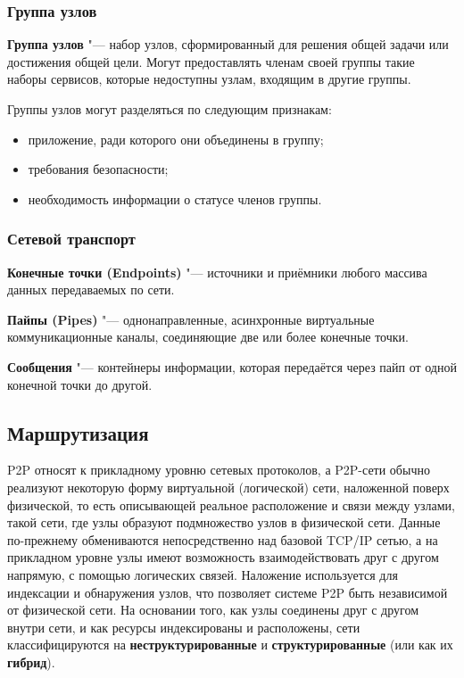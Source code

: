 \documentclass[bachelor, och, coursework]{SCWorks}
\begin{document}
\subsubsection{Группа узлов}
\textbf{Группа узлов} "--- набор узлов, сформированный для решения общей задачи или достижения общей цели. 
Могут предоставлять членам своей группы такие наборы сервисов, которые недоступны узлам, входящим в другие группы.

Группы узлов могут разделяться по следующим признакам:
\begin{itemize}
    \item приложение, ради которого они объединены в группу;
    \item требования безопасности;
    \item необходимость информации о статусе членов группы.
\end{itemize}

\subsubsection{Сетевой транспорт}
\textbf{Конечные точки (Endpoints)} "--- источники и приёмники любого массива данных передаваемых по сети.

\textbf{Пайпы (Pipes)} "--- однонаправленные, асинхронные виртуальные коммуникационные каналы, соединяющие две или более конечные точки.

\textbf{Сообщения} "--- контейнеры информации, которая передаётся через пайп от одной конечной точки до другой.

\subsection{Маршрутизация}
P2P относят к прикладному уровню сетевых протоколов, а P2P-сети обычно реализуют некоторую форму виртуальной (логической) сети, наложенной поверх физической, то есть описывающей реальное расположение
и связи между узлами, такой сети, где узлы образуют подмножество узлов в физической сети. 
Данные по-прежнему обмениваются непосредственно над базовой TCP/IP сетью, 
а на прикладном уровне узлы имеют возможность взаимодействовать друг с другом напрямую, 
с помощью логических связей. Наложение используется для индексации и обнаружения узлов, 
что позволяет системе P2P быть независимой от физической сети. На основании того, как узлы соединены 
друг с другом внутри сети, и как ресурсы индексированы и расположены, сети классифицируются на 
\textbf{неструктурированные} и \textbf{структурированные} (или как их \textbf{гибрид}).
\end{document}
